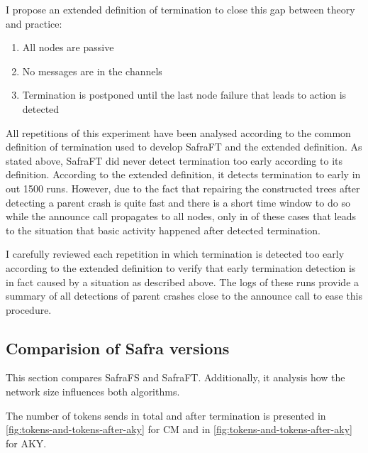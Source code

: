 I propose an extended definition of termination to close this gap between theory and practice:
\begin{enumerate}
	\item All nodes are passive
	\item No messages are in the channels
	\item Termination is postponed until the last node failure that leads to action is detected
\end{enumerate}
\label{extended-definition}
All repetitions of this experiment have been analysed according to the common definition of termination used to develop SafraFT and the extended definition.
As stated above, SafraFT did never detect termination too early according to its definition.
According to the extended definition, it detects termination to early in  out 1500 runs.  %
However, due to the fact that repairing the constructed trees after detecting a parent crash is quite fast and there is a short time window to do so while the announce call propagates to all nodes, only in  of these cases that leads to the situation that basic activity happened after detected termination. %


I carefully reviewed each repetition in which termination is detected too early according to the extended definition to verify that early termination detection is in fact caused by a situation as described above.
The logs of these runs provide a summary of all detections of parent crashes close to the announce call to ease this procedure.

\subsection{Comparision of Safra versions}
This section compares SafraFS and SafraFT. 
Additionally, it analysis how the network size influences both algorithms.

The number of tokens sends in total and after termination is presented in \cref{fig:tokens-and-tokens-after-aky} for CM and in \cref{fig:tokens-and-tokens-after-aky} for AKY.

